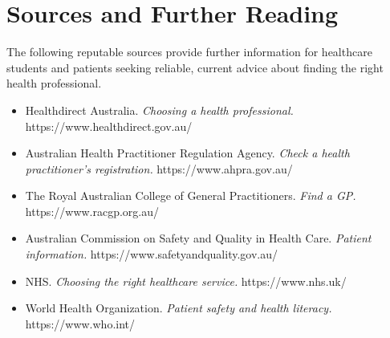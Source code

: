 \section*{Sources and Further Reading}
The following reputable sources provide further information for healthcare students and patients seeking reliable, current advice about finding the right health professional.
\begin{itemize}
    \item Healthdirect Australia. \textit{Choosing a health professional.} https://www.healthdirect.gov.au/
    \item Australian Health Practitioner Regulation Agency. \textit{Check a health practitioner's registration.} https://www.ahpra.gov.au/
    \item The Royal Australian College of General Practitioners. \textit{Find a GP.} https://www.racgp.org.au/
    \item Australian Commission on Safety and Quality in Health Care. \textit{Patient information.} https://www.safetyandquality.gov.au/
    \item NHS. \textit{Choosing the right healthcare service.} https://www.nhs.uk/
    \item World Health Organization. \textit{Patient safety and health literacy.} https://www.who.int/
\end{itemize}
